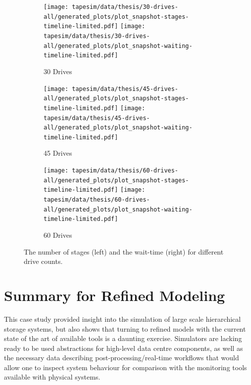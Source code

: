 \documentclass{../../template/esiwace-report}
\begin{document}
\begin{figure}
	\centering
	\begin{subfigure}[t]{\textwidth}
		\caption{30 Drives}
		\texttt{[image: tapesim/data/thesis/30-drives-all/generated\_plots/plot\_snapshot-stages-timeline-limited.pdf]}
		\texttt{[image: tapesim/data/thesis/30-drives-all/generated\_plots/plot\_snapshot-waiting-timeline-limited.pdf]}
	\end{subfigure}
	\begin{subfigure}[t]{\textwidth}
		\caption{45 Drives}
		\texttt{[image: tapesim/data/thesis/45-drives-all/generated\_plots/plot\_snapshot-stages-timeline-limited.pdf]}
		\texttt{[image: tapesim/data/thesis/45-drives-all/generated\_plots/plot\_snapshot-waiting-timeline-limited.pdf]}
	\end{subfigure}
	\begin{subfigure}[t]{\textwidth}
		\caption{60 Drives}
		\texttt{[image: tapesim/data/thesis/60-drives-all/generated\_plots/plot\_snapshot-stages-timeline-limited.pdf]}
		\texttt{[image: tapesim/data/thesis/60-drives-all/generated\_plots/plot\_snapshot-waiting-timeline-limited.pdf]}
	\end{subfigure}

	\caption{The number of stages (left) and the wait-time (right) for different drive counts.}
	\label{fig:stages-waits}
\end{figure}









\section{Summary for Refined Modeling}

This case study provided insight into the simulation of large scale hierarchical storage systems, but also shows that turning to refined models with the current state of the art of available tools is a daunting exercise.
Simulators are lacking ready to be used abstractions for high-level data centre components, as well as the necessary data describing post-processing/real-time workflows that would allow one to inspect system behaviour for comparison with the monitoring tools available with physical systems.
\end{document}
